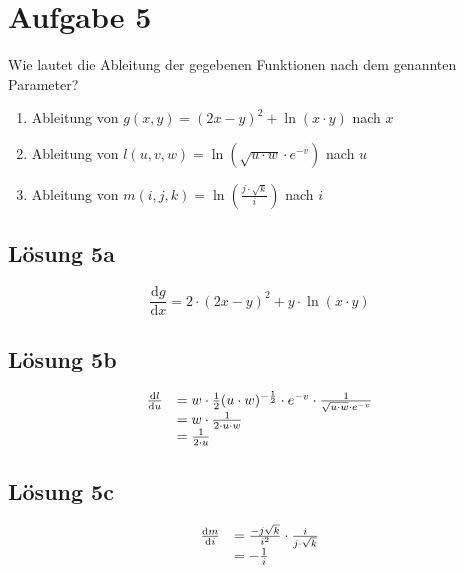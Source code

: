 \documentclass[main.tex]{subfiles}
\begin{document}
\section{Aufgabe 5}
Wie lautet die Ableitung der gegebenen Funktionen nach dem genannten Parameter?

\begin{enumerate}
    \item Ableitung von $g( x,y) =( 2x-y)^{2} +\ln( x\cdotp y)$ nach $x$
    \item Ableitung von $l( u,v,w) =\ln\left(\sqrt{u\cdotp w} \cdotp e^{-v}\right)$ nach $u$
    \item Ableitung von $m( i,j,k) =\ln\left(\frac{j\cdotp \sqrt{k}}{i}\right)$ nach $i$
\end{enumerate}

\subsection{Lösung 5a}
$$
    \frac{\mathrm{d}g}{\mathrm{d}x} =2\cdotp ( 2x-y)^{2} +y\cdotp \ln( x\cdotp y)
$$

\subsection{Lösung 5b}
\begin{equation*}
    \begin{array}{ c l }
    \frac{\mathrm{d}l}{\mathrm{d}u} & =w\cdotp \frac{1}{2}( u\cdotp w)^{-\frac{1}{2}} \cdotp e^{-v} \cdotp \frac{1}{\sqrt{u\cdotp w} \cdotp e^{-v}}\\
     & =w\cdotp \frac{1}{2\cdotp u\cdotp w}\\
     & =\frac{1}{2\cdotp u}
    \end{array}
\end{equation*}

\subsection{Lösung 5c}
\begin{equation*}
    \begin{array}{ c l }
    \frac{\mathrm{d}m}{\mathrm{d}i} & =\frac{-j\sqrt{k}}{i^{2}} \cdotp \frac{i}{j\cdotp \sqrt{k}}\\
     & =-\frac{1}{i}
    \end{array}
\end{equation*}
\end{document}
